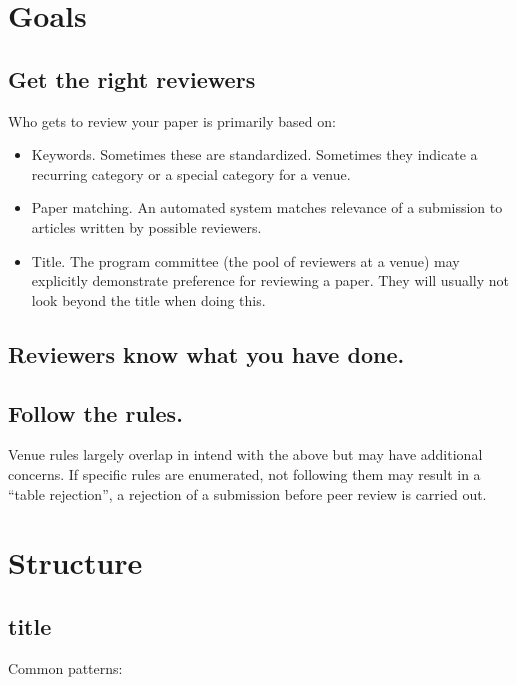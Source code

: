\section{Goals}

\subsection{Get the right reviewers}

Who gets to review your paper is primarily based on:
\begin{itemize}

\item{} Keywords. Sometimes these are standardized. Sometimes they indicate a recurring category or
  a special category for a venue.

\item{} Paper matching. An automated system matches relevance of a submission to articles written
  by possible reviewers.

\item{} Title. The program committee (the pool of reviewers at a venue) may explicitly demonstrate
  preference for reviewing a paper. They will usually not look beyond the title when doing this.
\end{itemize}

\subsection{Reviewers know what you have done.}

\subsection{Follow the rules.}

Venue rules largely overlap in intend with the above but may have additional concerns. If specific
rules are enumerated, not following them may result in a ``table rejection'', a rejection of a
submission before peer review is carried out.

\section{Structure}

\subsection{title}

  Common patterns:

